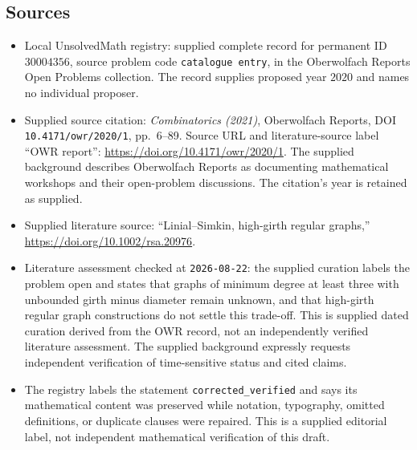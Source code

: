 \documentclass[11pt]{article}
\begin{document}
\subsection{Sources}
\begin{itemize}
\item Local UnsolvedMath registry: supplied complete record for permanent ID \(30004356\), source problem code \texttt{catalogue entry}, in the Oberwolfach Reports Open Problems collection. The record supplies proposed year \(2020\) and names no individual proposer.
\item Supplied source citation: \emph{Combinatorics (2021)}, Oberwolfach Reports, DOI \texttt{10.4171/owr/2020/1}, pp.\ 6--89. Source URL and literature-source label ``OWR report'': \url{https://doi.org/10.4171/owr/2020/1}. The supplied background describes Oberwolfach Reports as documenting mathematical workshops and their open-problem discussions. The citation's year is retained as supplied.
\item Supplied literature source: ``Linial--Simkin, high-girth regular graphs,'' \url{https://doi.org/10.1002/rsa.20976}.
\item Literature assessment checked at \texttt{2026-08-22}: the supplied curation labels the problem open and states that graphs of minimum degree at least three with unbounded girth minus diameter remain unknown, and that high-girth regular graph constructions do not settle this trade-off. This is supplied dated curation derived from the OWR record, not an independently verified literature assessment. The supplied background expressly requests independent verification of time-sensitive status and cited claims.
\item The registry labels the statement \texttt{corrected\_verified} and says its mathematical content was preserved while notation, typography, omitted definitions, or duplicate clauses were repaired. This is a supplied editorial label, not independent mathematical verification of this draft.
\end{itemize}
\end{document}
